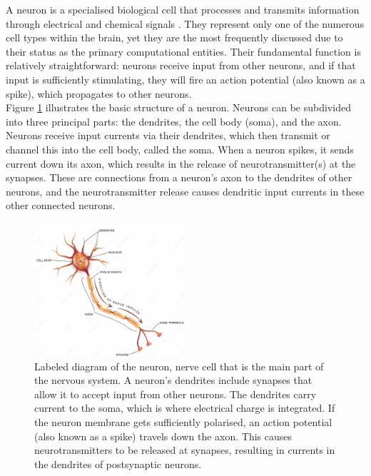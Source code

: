 \noindent  A neuron is a specialised biological cell that processes and transmits information through electrical and chemical signals \cite{mel1994information}. They represent only one of the numerous cell types within the brain, yet they are the most frequently discussed due to their status as the primary computational entities. Their fundamental function is relatively straightforward: neurons receive input from other neurons, and if that input is sufficiently stimulating, they will fire an action potential (also known as a spike), which propagates to other neurons.\\

\noindent Figure \ref{fig:2a} illustrates the basic structure of a neuron. Neurons can be subdivided into three principal parts: the dendrites, the cell body (soma), and the axon. Neurons receive input currents via their dendrites, which then transmit or channel this into the cell body, called the soma. When a neuron spikes, it sends current down its axon, which results in the release of neurotransmitter(s) at the synapses. These are connections from a neuron's axon to the dendrites of other neurons, and the neurotransmitter release causes dendritic input currents in these other connected neurons. \\

\begin{figure}[htbp!] 
    \centering    
    \includegraphics[width=0.5\textwidth]{Chapter2/Figs/a.png}
    \caption[Labeled diagram of the neuron.]{Labeled diagram of the neuron, nerve cell that is the main part of the nervous system. A neuron's dendrites include synapses that allow it to accept input from other neurons. The dendrites carry current to the soma, which is where electrical charge is integrated. If the neuron membrane gets sufficiently polarised, an action potential (also known as a spike) travels down the axon. This causes neurotransmitters to be released at synapses, resulting in currents in the dendrites of postsynaptic neurons.}
    \label{fig:2a}
    \end{figure}

